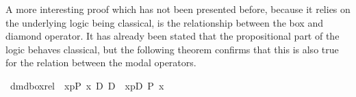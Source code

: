 A more interesting proof which has not been presented before, because it relies on
the underlying logic being classical, is the relationship between the box and
diamond operator. It has already been stated that the propositional part of the
logic behaves classical, but the following theorem confirms that this is also true
for the relation between the modal operators.
\begin{isabellebody}
\isanewline
{}\ dmd{\isacharunderscore}box{\isacharunderscore}rel{\isacharcolon}\ {\isachardoublequote}{\isasymturnstile}\ {\isasymlangle}x{\isasymleftarrow}p{\isasymrangle}{\isacharparenleft}P\ x{\isacharparenright}\ {\isasymlongleftrightarrow}\isactrlsub D\ {\isasymnot}\isactrlsub D\ {\isacharbrackleft}{\isacharhash}\ x{\isasymleftarrow}p{\isacharbrackright}{\isacharparenleft}{\isasymnot}\isactrlsub D\ P\ x{\isacharparenright}{\isachardoublequote}\isanewline
\end{isabellebody}


